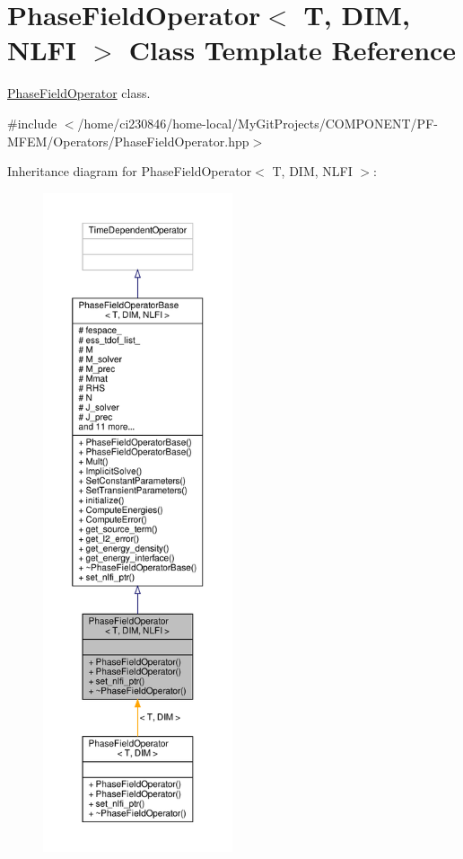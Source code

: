 \hypertarget{classPhaseFieldOperator}{}\section{Phase\+Field\+Operator$<$ T, D\+IM, N\+L\+FI $>$ Class Template Reference}
\label{classPhaseFieldOperator}


\hyperlink{classPhaseFieldOperator}{Phase\+Field\+Operator} class.  




{\ttfamily \#include $<$/home/ci230846/home-\/local/\+My\+Git\+Projects/\+C\+O\+M\+P\+O\+N\+E\+N\+T/\+P\+F-\/\+M\+F\+E\+M/\+Operators/\+Phase\+Field\+Operator.\+hpp$>$}



Inheritance diagram for Phase\+Field\+Operator$<$ T, D\+IM, N\+L\+FI $>$\+:\nopagebreak
\begin{figure}[H]
\begin{center}
\leavevmode
\includegraphics[height=550pt]{classPhaseFieldOperator__inherit__graph}
\end{center}
\end{figure}


